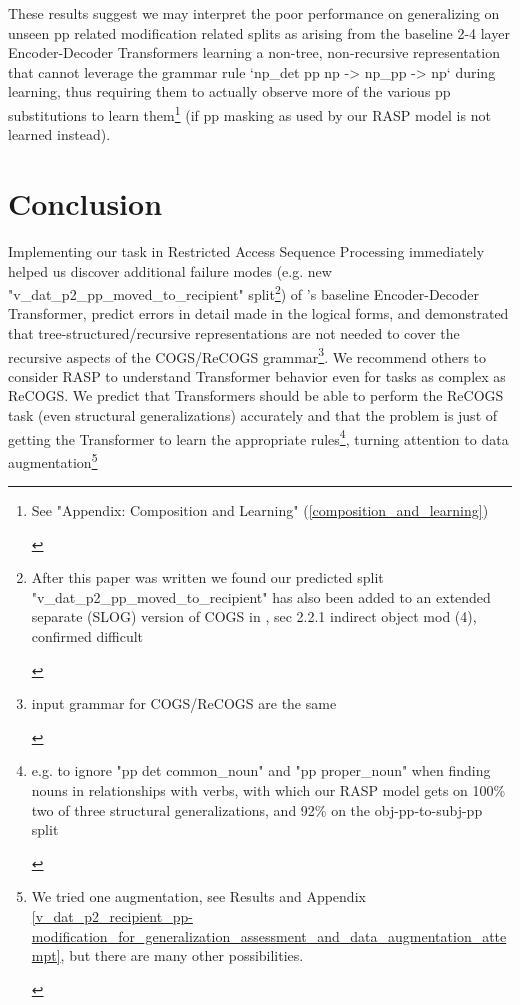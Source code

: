 \documentclass[11pt]{article}
\begin{document}
These results 
suggest we may interpret the poor performance on generalizing on unseen pp related modification related splits as arising from the baseline 2-4 layer Encoder-Decoder Transformers learning a non-tree, non-recursive representation that cannot leverage the grammar rule `np\_det pp np -> np\_pp -> np` during learning, thus requiring them to actually observe more of the various pp substitutions to learn them\footnote{\begin{footnotesize}See "Appendix: Composition and Learning" (\ref{composition_and_learning})\end{footnotesize}} (if pp masking as used by our RASP model is not learned instead). \section{Conclusion} Implementing our task in Restricted Access Sequence Processing immediately helped us discover additional failure modes (e.g. new "v\_dat\_p2\_pp\_moved\_to\_recipient" split\footnote{\begin{footnotesize}After this paper was written we found our predicted split "v\_dat\_p2\_pp\_moved\_to\_recipient" has also been added to an extended separate (SLOG) version of COGS in \cite{li2023slogstructuralgeneralizationbenchmark}, sec 2.2.1 indirect object mod (4), confirmed difficult
\end{footnotesize}
}) of \cite{Wu2023}'s baseline Encoder-Decoder Transformer, predict errors in detail made in the logical forms, and demonstrated that tree-structured/recursive representations are not needed to cover the recursive aspects of the COGS/ReCOGS grammar\footnote{\begin{footnotesize}input grammar for COGS/ReCOGS are the same\end{footnotesize}}. We recommend others to consider RASP to understand Transformer behavior even for tasks as complex as ReCOGS. We predict that Transformers should be able to perform the ReCOGS task (even structural generalizations) accurately and that the problem is just of getting the Transformer to learn the appropriate rules\footnote{\begin{footnotesize}e.g. to ignore "pp det common\_noun" and "pp proper\_noun" when finding nouns in relationships with verbs, with which our RASP model gets on 100\% two of three structural generalizations, and 92\% on the obj-pp-to-subj-pp split\end{footnotesize}}, turning attention to data augmentation\footnote{\begin{footnotesize}We tried one augmentation, see Results and Appendix \ref{v_dat_p2_recipient_pp-modification_for_generalization_assessment_and_data_augmentation_attempt}, but there are many other possibilities.

\end{footnotesize}}
\end{document}
